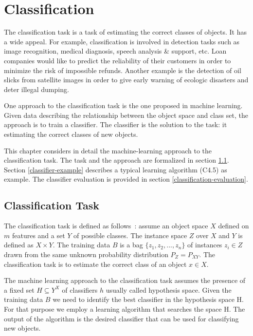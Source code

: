 \chapter{Classification}\label{Classification}
The classification task is a task of estimating the correct classes of objects. It has a wide appeal. For example,  classification is involved in detection tasks such as image recognition, medical diagnosis, speech analysis \& support, etc. Loan companies would like to predict the reliability of their customers in order to minimize the risk of impossible refunds. Another example is the detection of oil slicks from satellite images in order to give early warning of ecologic disasters and deter illegal dumping. 

One approach to the classification task is the one proposed in machine learning. Given data describing the relationship between the object space and class set, the approach is to train a classifier. The classifier is  the solution to the task: it estimating the correct classes of new objects.

This chapter considers in detail the machine-learning approach to the classification task. The task and the approach are formalized in section \ref{classification-task}. Section \ref{classifier-example} describes a typical learning algorithm (C4.5) as example. The classifier evaluation is provided in section \ref{classification-evaluation}. 




\section{Classification Task}\label{classification-task}
 
The classification task  is defined as follows~\cite{RegionClassif08}: assume an object space $X$ defined on $m$ features and a set $Y$ of possible classes. The instance space $Z$ over $X$ and $Y$ is defined as \(X \times Y\). The training data \(B\) is a bag \(\lbrace z_1,z_2,...,z_n \rbrace\) of instances \(z_i \in Z\) drawn from the same unknown probability distribution \(P_Z = P_{XY}\).  The classification task is to estimate the correct class of an object $x \in X$.

The machine learning approach to the classification task assumes the presence of   a fixed set \(H \subseteq Y^X\) of classifiers $h$ usually called hypothesis space.  Given the training data \(B\) we need to identify the best classifier in the hypothesis space H. For that purpose we employ a learning algorithm that searches the space H. The output of the algorithm is the desired classifier that can be used for classifying new objects.

